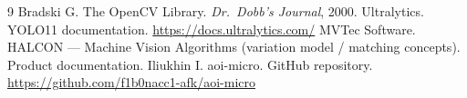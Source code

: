 \documentclass[12pt,a4paper]{article}
\begin{document}
\begin{thebibliography}{9}
  Bradski G. The OpenCV Library. \textit{Dr.\ Dobb's Journal}, 2000.
  Ultralytics. YOLO11 documentation.
  \url{https://docs.ultralytics.com/}
  MVTec Software. HALCON --- Machine Vision Algorithms (variation model /
  matching concepts). Product documentation.
  Iliukhin I. aoi-micro. GitHub repository.
  \url{https://github.com/f1b0nacc1-afk/aoi-micro}
\end{thebibliography}
\end{document}
